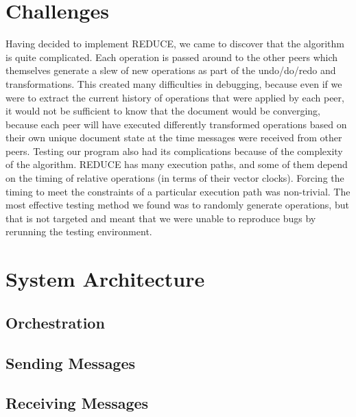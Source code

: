 \documentclass{article}
\begin{document}
\section{Challenges}
Having decided to implement REDUCE, we came to discover that the algorithm is quite complicated. Each operation is passed around to the other peers which themselves generate a slew of new operations as part of the undo/do/redo and transformations. This created many difficulties in debugging, because even if we were to extract the current history of operations that were applied by each peer, it would not be sufficient to know that the document would be converging, because each peer will have executed differently transformed operations based on their own unique document state at the time messages were received from other peers. Testing our program also had its complications because of the complexity of the algorithm. REDUCE has many execution paths, and some of them depend on the timing of relative operations (in terms of their vector clocks). Forcing the timing to meet the constraints of a particular execution path was non-trivial. The most effective testing method we found was to randomly generate operations, but that is not targeted and meant that we were unable to reproduce bugs by rerunning the testing environment.\\

\section{System Architecture}








\subsection{Orchestration}

\subsection{Sending Messages}

\subsection{Receiving Messages}
\end{document}
